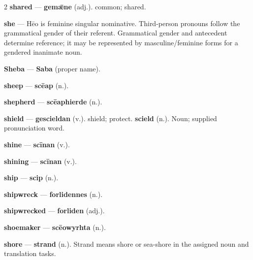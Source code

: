 \begin{multicols}{2}
\textbf{shared} — \textbf{gemǣne} (adj.). common; shared.\par
\textbf{she} — Hēo is feminine singular nominative. Third-person pronouns follow the grammatical gender of their referent. Grammatical gender and antecedent determine reference; it may be represented by masculine/feminine forms for a gendered inanimate noun.\par
\textbf{Sheba} — \textbf{Saba} (proper name).\par
\textbf{sheep} — \textbf{scēap} (n.).\par
\textbf{shepherd} — \textbf{scēaphierde} (n.).\par
\textbf{shield} — \textbf{gescieldan} (v.). shield; protect. \textbf{scield} (n.). Noun; supplied pronunciation word.\par
\textbf{shine} — \textbf{scīnan} (v.).\par
\textbf{shining} — \textbf{scīnan} (v.).\par
\textbf{ship} — \textbf{scip} (n.).\par
\textbf{shipwreck} — \textbf{forlidennes} (n.).\par
\textbf{shipwrecked} — \textbf{forliden} (adj.).\par
\textbf{shoemaker} — \textbf{scēowyrhta} (n.).\par
\textbf{shore} — \textbf{strand} (n.). Strand means shore or sea-shore in the assigned noun and translation tasks.\par

\end{multicols}
